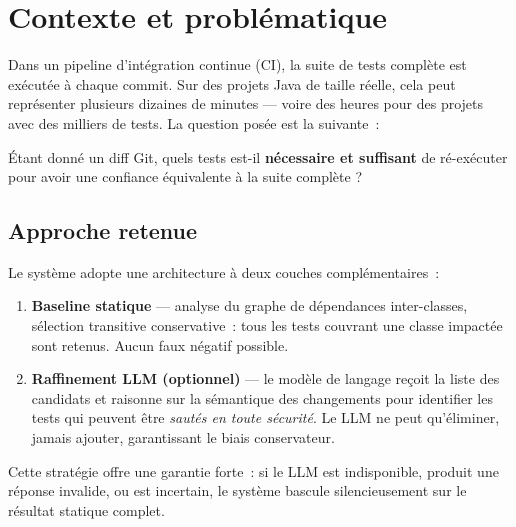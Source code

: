 \documentclass[12pt,a4paper]{article}
\begin{document}
\tableofcontents
\newpage

\section{Contexte et problématique}

Dans un pipeline d'intégration continue (CI), la suite de tests complète est
exécutée à chaque commit. Sur des projets Java de taille réelle, cela peut
représenter plusieurs dizaines de minutes — voire des heures pour des projets
avec des milliers de tests. La question posée est la suivante~:

\begin{tcolorbox}[colback=rtsblue!5, colframe=rtsblue, arc=4pt, title={\textbf{Problème central}}]
Étant donné un diff Git, quels tests est-il \textbf{nécessaire et suffisant}
de ré-exécuter pour avoir une confiance équivalente à la suite complète ?
\end{tcolorbox}

\subsection{Approche retenue}

Le système adopte une architecture à deux couches complémentaires~:

\begin{enumerate}[leftmargin=*, label=\textbf{\arabic{enumi}.}]
  \item \textbf{Baseline statique} — analyse du graphe de dépendances inter-classes,
        sélection transitive conservative~: tous les tests couvrant une classe
        impactée sont retenus. Aucun faux négatif possible.

  \item \textbf{Raffinement LLM (optionnel)} — le modèle de langage reçoit la
        liste des candidats et raisonne sur la sémantique des changements pour
        identifier les tests qui peuvent être \textit{sautés en toute sécurité}.
        Le LLM ne peut qu'éliminer, jamais ajouter, garantissant le biais
        conservateur.
\end{enumerate}

Cette stratégie offre une garantie forte~: si le LLM est indisponible, produit
une réponse invalide, ou est incertain, le système bascule silencieusement sur
le résultat statique complet.

\end{document}
